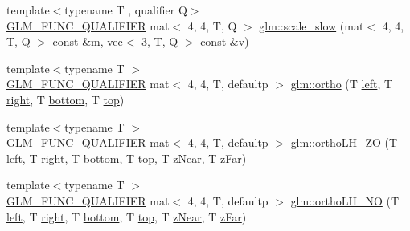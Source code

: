 \begin{DoxyCompactItemize}
\item 
{\footnotesize template$<$typename T , qualifier Q$>$ }\\\mbox{\hyperlink{setup_8hpp_a33fdea6f91c5f834105f7415e2a64407}{G\+L\+M\+\_\+\+F\+U\+N\+C\+\_\+\+Q\+U\+A\+L\+I\+F\+I\+ER}} mat$<$ 4, 4, T, Q $>$ \mbox{\hyperlink{namespaceglm_a48c8a5c9d619e11a0e2908d7099f361f}{glm\+::scale\+\_\+slow}} (mat$<$ 4, 4, T, Q $>$ const \&\mbox{\hyperlink{_s_d_l__opengl__glext_8h_af593500c283bf1a787a6f947f503a5c2}{m}}, vec$<$ 3, T, Q $>$ const \&\mbox{\hyperlink{_s_d_l__opengl_8h_a10a82eabcb59d2fcd74acee063775f90}{v}})
\item 
{\footnotesize template$<$typename T $>$ }\\\mbox{\hyperlink{setup_8hpp_a33fdea6f91c5f834105f7415e2a64407}{G\+L\+M\+\_\+\+F\+U\+N\+C\+\_\+\+Q\+U\+A\+L\+I\+F\+I\+ER}} mat$<$ 4, 4, T, defaultp $>$ \mbox{\hyperlink{group__gtc__matrix__transform_gae5b6b40ed882cd56cd7cb97701909c06}{glm\+::ortho}} (T \mbox{\hyperlink{_s_d_l__opengl__glext_8h_a85b8f6c07fbc1fb5d77c2ae090f21995}{left}}, T \mbox{\hyperlink{_s_d_l__opengl__glext_8h_a5ffadbbacc6b89cf6218bc43b384d3fe}{right}}, T \mbox{\hyperlink{_s_d_l__opengl__glext_8h_a95fc257e5ddf46f7db9d5e898cdf1991}{bottom}}, T \mbox{\hyperlink{_s_d_l__opengl__glext_8h_a5ab323daeacf8dfdb8f91132fecdca23}{top}})
\item 
{\footnotesize template$<$typename T $>$ }\\\mbox{\hyperlink{setup_8hpp_a33fdea6f91c5f834105f7415e2a64407}{G\+L\+M\+\_\+\+F\+U\+N\+C\+\_\+\+Q\+U\+A\+L\+I\+F\+I\+ER}} mat$<$ 4, 4, T, defaultp $>$ \mbox{\hyperlink{group__gtc__matrix__transform_gab37ac3eec8d61f22fceda7775e836afa}{glm\+::ortho\+L\+H\+\_\+\+ZO}} (T \mbox{\hyperlink{_s_d_l__opengl__glext_8h_a85b8f6c07fbc1fb5d77c2ae090f21995}{left}}, T \mbox{\hyperlink{_s_d_l__opengl__glext_8h_a5ffadbbacc6b89cf6218bc43b384d3fe}{right}}, T \mbox{\hyperlink{_s_d_l__opengl__glext_8h_a95fc257e5ddf46f7db9d5e898cdf1991}{bottom}}, T \mbox{\hyperlink{_s_d_l__opengl__glext_8h_a5ab323daeacf8dfdb8f91132fecdca23}{top}}, T \mbox{\hyperlink{_s_d_l__opengl__glext_8h_a12d99226e590bbaaf0be69169eeb4834}{z\+Near}}, T \mbox{\hyperlink{_s_d_l__opengl__glext_8h_a1052a8235df129542aea6da80fbec6a1}{z\+Far}})
\item 
{\footnotesize template$<$typename T $>$ }\\\mbox{\hyperlink{setup_8hpp_a33fdea6f91c5f834105f7415e2a64407}{G\+L\+M\+\_\+\+F\+U\+N\+C\+\_\+\+Q\+U\+A\+L\+I\+F\+I\+ER}} mat$<$ 4, 4, T, defaultp $>$ \mbox{\hyperlink{group__gtc__matrix__transform_ga526416735ea7c5c5cd255bf99d051bd8}{glm\+::ortho\+L\+H\+\_\+\+NO}} (T \mbox{\hyperlink{_s_d_l__opengl__glext_8h_a85b8f6c07fbc1fb5d77c2ae090f21995}{left}}, T \mbox{\hyperlink{_s_d_l__opengl__glext_8h_a5ffadbbacc6b89cf6218bc43b384d3fe}{right}}, T \mbox{\hyperlink{_s_d_l__opengl__glext_8h_a95fc257e5ddf46f7db9d5e898cdf1991}{bottom}}, T \mbox{\hyperlink{_s_d_l__opengl__glext_8h_a5ab323daeacf8dfdb8f91132fecdca23}{top}}, T \mbox{\hyperlink{_s_d_l__opengl__glext_8h_a12d99226e590bbaaf0be69169eeb4834}{z\+Near}}, T \mbox{\hyperlink{_s_d_l__opengl__glext_8h_a1052a8235df129542aea6da80fbec6a1}{z\+Far}})

\end{DoxyCompactItemize}
